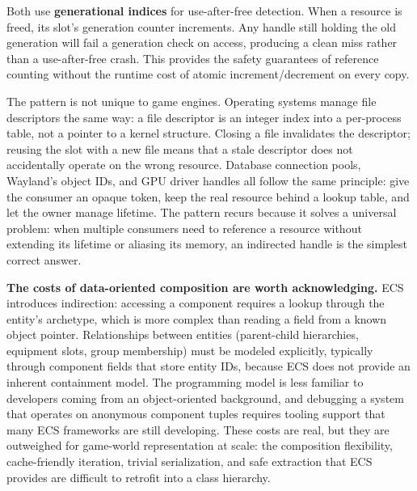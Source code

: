 \documentclass[
  11pt,
  letterpaper,
  DIV=11,
  numbers=noendperiod,
  twoside,
  open=right]{scrreprt}
\begin{document}
Both use \textbf{generational indices} for use-after-free detection.
When a resource is freed, its slot's generation counter increments. Any
handle still holding the old generation will fail a generation check on
access, producing a clean miss rather than a use-after-free crash. This
provides the safety guarantees of reference counting without the runtime
cost of atomic increment/decrement on every copy.

The pattern is not unique to game engines. Operating systems manage file
descriptors the same way: a file descriptor is an integer index into a
per-process table, not a pointer to a kernel structure. Closing a file
invalidates the descriptor; reusing the slot with a new file means that
a stale descriptor does not accidentally operate on the wrong resource.
Database connection pools, Wayland's object IDs, and GPU driver handles
all follow the same principle: give the consumer an opaque token, keep
the real resource behind a lookup table, and let the owner manage
lifetime. The pattern recurs because it solves a universal problem: when
multiple consumers need to reference a resource without extending its
lifetime or aliasing its memory, an indirected handle is the simplest
correct answer.

\textbf{The costs of data-oriented composition are worth acknowledging.}
ECS introduces indirection: accessing a component requires a lookup
through the entity's archetype, which is more complex than reading a
field from a known object pointer. Relationships between entities
(parent-child hierarchies, equipment slots, group membership) must be
modeled explicitly, typically through component fields that store entity
IDs, because ECS does not provide an inherent containment model. The
programming model is less familiar to developers coming from an
object-oriented background, and debugging a system that operates on
anonymous component tuples requires tooling support that many ECS
frameworks are still developing. These costs are real, but they are
outweighed for game-world representation at scale: the composition
flexibility, cache-friendly iteration, trivial serialization, and safe
extraction that ECS provides are difficult to retrofit into a class
hierarchy.
\end{document}
